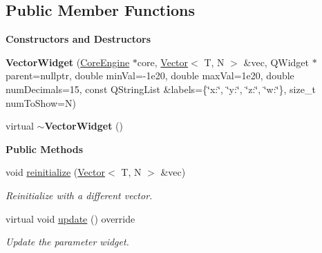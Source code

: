 \subsection*{Public Member Functions}
\begin{Indent}\textbf{ Constructors and Destructors}\par
\begin{DoxyCompactItemize}
\item 
\mbox{\label{classrev_1_1_view_1_1_vector_widget_abe2ae5656ecca67135853cd6e3d9dc4f}} 
{\bfseries Vector\+Widget} (\mbox{\hyperlink{classrev_1_1_core_engine}{Core\+Engine}} $\ast$core, \mbox{\hyperlink{classrev_1_1_vector}{Vector}}$<$ T, N $>$ \&vec, Q\+Widget $\ast$parent=nullptr, double min\+Val=-\/1e20, double max\+Val=1e20, double num\+Decimals=15, const Q\+String\+List \&labels=\{\char`\"{}x\+:\char`\"{}, \char`\"{}y\+:\char`\"{}, \char`\"{}z\+:\char`\"{}, \char`\"{}w\+:\char`\"{}\}, size\+\_\+t num\+To\+Show=\+N)
\item 
\mbox{\label{classrev_1_1_view_1_1_vector_widget_ab9e0648509d867fb3b44ad51d946cc09}} 
virtual {\bfseries $\sim$\+Vector\+Widget} ()
\end{DoxyCompactItemize}
\end{Indent}
\begin{Indent}\textbf{ Public Methods}\par
\begin{DoxyCompactItemize}
\item 
\mbox{\label{classrev_1_1_view_1_1_vector_widget_a18771ac00464f549c14171d252eb7d76}} 
void \mbox{\hyperlink{classrev_1_1_view_1_1_vector_widget_a18771ac00464f549c14171d252eb7d76}{reinitialize}} (\mbox{\hyperlink{classrev_1_1_vector}{Vector}}$<$ T, N $>$ \&vec)
\begin{DoxyCompactList}\small\item\em Reinitialize with a different vector. \end{DoxyCompactList}\item 
\mbox{\label{classrev_1_1_view_1_1_vector_widget_a125985140cf40973a8a66568e2b91c98}} 
virtual void \mbox{\hyperlink{classrev_1_1_view_1_1_vector_widget_a125985140cf40973a8a66568e2b91c98}{update}} () override
\begin{DoxyCompactList}\small\item\em Update the parameter widget. \end{DoxyCompactList}\end{DoxyCompactItemize}
\end{Indent}
